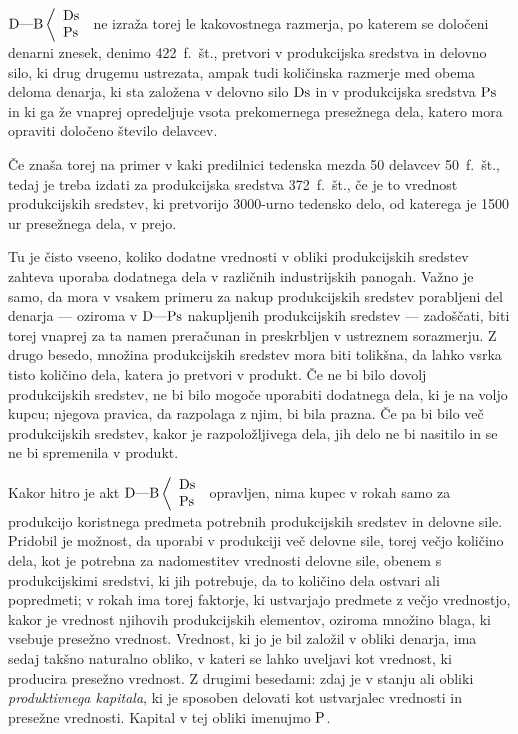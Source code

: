 \documentclass[kapital_02.tex]{subfiles}
\begin{document}
\( 
    \textrm{D}\textrm{---}\textrm{B}\left< 
    \begin{array}{l}
        \textrm{Ds}\\
        \textrm{Ps}\\
    \end{array}
    \right.
\) ne izraža torej le kakovostnega razmerja, po katerem se določeni denarni znesek, denimo 422~f.~št., pretvori v produkcijska sredstva in delovno silo, ki drug drugemu ustrezata, ampak tudi količinska razmerje med obema deloma denarja, ki sta založena v delovno silo \( \textrm{Ds} \) in v produkcijska sredstva \( \textrm{Ps} \) in ki ga že vnaprej opredeljuje vsota prekomernega presežnega dela, katero mora opraviti določeno število delavcev.

Če znaša torej na primer v kaki predilnici tedenska mezda 50 delavcev 50~f.~št., tedaj je treba izdati za produkcijska sredstva 372~f.~št., če je to vrednost produkcijskih sredstev, ki pretvorijo 3000-urno tedensko delo, od katerega je 1500 ur presežnega dela, v prejo.

Tu je čisto vseeno, koliko dodatne vrednosti v obliki produkcijskih sredstev zahteva uporaba dodatnega dela v različnih industrijskih panogah. Važno je samo, da mora v vsakem primeru za nakup produkcijskih sredstev porabljeni del denarja --- oziroma v \( \textrm{D}\textrm{---}\textrm{Ps} \) nakupljenih produkcijskih sredstev --- zadoščati, biti torej vnaprej za ta namen preračunan in preskrbljen v ustreznem sorazmerju. Z drugo besedo, množina produkcijskih sredstev mora biti tolikšna, da lahko vsrka tisto količino dela, katera jo pretvori v produkt. Če ne bi bilo dovolj produkcijskih sredstev, ne bi bilo mogoče uporabiti dodatnega dela, ki je na voljo kupcu; njegova pravica, da razpolaga z njim, bi bila prazna. Če pa bi bilo več produkcijskih sredstev, kakor je razpoložljivega dela, jih delo ne bi nasitilo in se ne bi spremenila v produkt.

Kakor hitro je akt \( 
    \textrm{D}\textrm{---}\textrm{B}\left< 
    \begin{array}{l}
        \textrm{Ds}\\
        \textrm{Ps}\\
    \end{array}
    \right.
\) opravljen, nima kupec v rokah samo za produkcijo koristnega predmeta potrebnih produkcijskih sredstev in delovne sile. Pridobil je možnost, da uporabi v produkciji več delovne sile, torej večjo količino dela, kot je potrebna za nadomestitev vrednosti delovne sile, obenem s produkcijskimi sredstvi, ki jih potrebuje, da to količino dela ostvari ali popredmeti; v rokah ima torej faktorje, ki ustvarjajo predmete z večjo vrednostjo, kakor je vrednost njihovih produkcijskih elementov, oziroma množino blaga, ki vsebuje presežno vrednost. Vrednost, ki jo je bil založil v obliki denarja, ima sedaj takšno naturalno obliko, v kateri se lahko uveljavi kot vrednost, ki producira presežno vrednost. Z drugimi besedami: zdaj je v stanju ali obliki \emph{produktivnega kapitala}, ki je sposoben delovati kot ustvarjalec vrednosti in presežne vrednosti. Kapital v tej obliki imenujmo \( \textrm{P} \).
\end{document}
